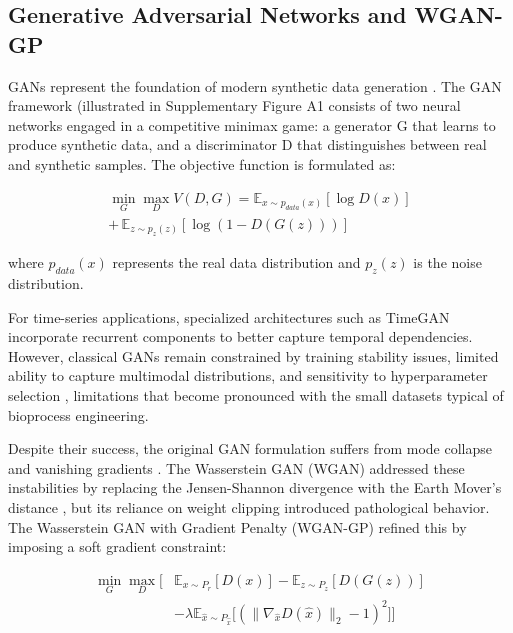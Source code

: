 \documentclass[12pt,twocolumn]{article}
\begin{document}
\subsection{Generative Adversarial Networks and WGAN-GP}

GANs represent the foundation of modern synthetic data generation \cite{goodfellow2014generativeadversarialnetworks}. The GAN framework (illustrated in Supplementary Figure A1 %
consists of two neural networks engaged in a competitive minimax game: a generator G that learns to produce synthetic data, and a discriminator D that distinguishes between real and synthetic samples. The objective function is formulated as:



\begin{multline}
\min_G \max_D V(D,G) = \mathbb{E}_{x\sim p_{data}(x)}[\log D(x)] \\
+ \, \mathbb{E}_{z\sim p_z(z)}[\log(1-D(G(z)))]
\end{multline}

where $p_{data}(x)$ represents the real data distribution and $p_z(z)$ is the noise distribution.

For time-series applications, specialized architectures such as TimeGAN \cite{yoon2019TimeGAN} incorporate recurrent components to better capture temporal dependencies. However, classical GANs remain constrained by training stability issues, limited ability to capture multimodal distributions, and sensitivity to hyperparameter selection \cite{Arjovsky2017, gulrajani2017improved}, limitations that become pronounced with the small datasets typical of bioprocess engineering.

Despite their success, the original GAN formulation suffers from mode collapse and vanishing gradients \cite{Arjovsky2017}. The Wasserstein GAN (WGAN) addressed these instabilities by replacing the Jensen-Shannon divergence with the Earth Mover's distance \cite{arjovsky17a}, but its reliance on weight clipping introduced pathological behavior. The Wasserstein GAN with Gradient Penalty (WGAN-GP) \cite{gulrajani2017improved} refined this by imposing a soft gradient constraint:

\begin{equation}
\label{eq:wgangp}
\begin{split}
\min_G \max_D \bigl[ & \mathbb{E}_{x\sim P_r}[D(x)] - \mathbb{E}_{z\sim P_z}[D(G(z))] \\
& - \lambda\mathbb{E}_{\hat{x}\sim P_{\hat{x}}}\bigl[(\|\nabla_{\hat{x}}D(\hat{x})\|_2 - 1)^2\bigr] \bigr]
\end{split}
\end{equation}
\end{document}
